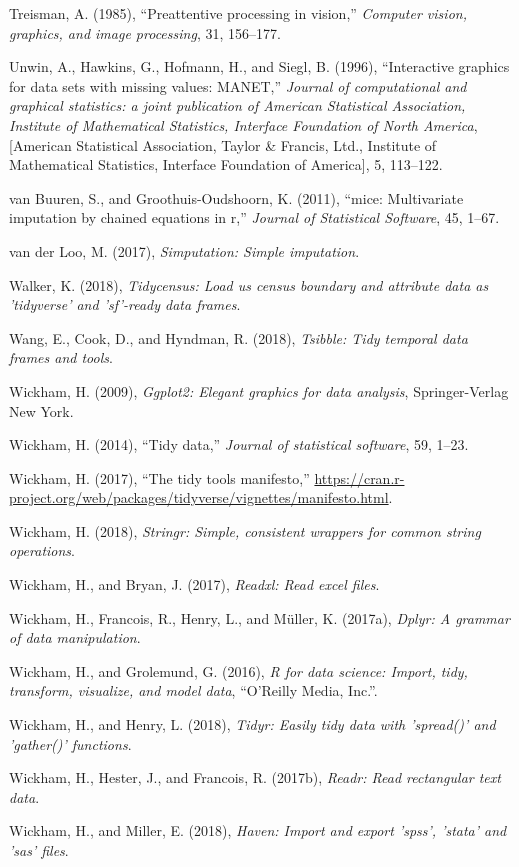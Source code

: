 \documentclass[]{article}
\theoremstyle{definition}
\theoremstyle{definition}
\theoremstyle{definition}
\theoremstyle{remark}
\begin{document}
\leavevmode\hypertarget{ref-treisman1985}{}%
Treisman, A. (1985), ``Preattentive processing in vision,''
\emph{Computer vision, graphics, and image processing}, 31, 156--177.

\leavevmode\hypertarget{ref-Unwin1996}{}%
Unwin, A., Hawkins, G., Hofmann, H., and Siegl, B. (1996), ``Interactive
graphics for data sets with missing values: MANET,'' \emph{Journal of
computational and graphical statistics: a joint publication of American
Statistical Association, Institute of Mathematical Statistics, Interface
Foundation of North America}, {[}American Statistical Association,
Taylor \& Francis, Ltd., Institute of Mathematical Statistics, Interface
Foundation of America{]}, 5, 113--122.

\leavevmode\hypertarget{ref-mice}{}%
van Buuren, S., and Groothuis-Oudshoorn, K. (2011), ``mice: Multivariate
imputation by chained equations in r,'' \emph{Journal of Statistical
Software}, 45, 1--67.

\leavevmode\hypertarget{ref-simputation}{}%
van der Loo, M. (2017), \emph{Simputation: Simple imputation}.

\leavevmode\hypertarget{ref-tidycensus}{}%
Walker, K. (2018), \emph{Tidycensus: Load us census boundary and
attribute data as 'tidyverse' and 'sf'-ready data frames}.

\leavevmode\hypertarget{ref-tsibble}{}%
Wang, E., Cook, D., and Hyndman, R. (2018), \emph{Tsibble: Tidy temporal
data frames and tools}.

\leavevmode\hypertarget{ref-ggplot2}{}%
Wickham, H. (2009), \emph{Ggplot2: Elegant graphics for data analysis},
Springer-Verlag New York.

\leavevmode\hypertarget{ref-Wickham2014}{}%
Wickham, H. (2014), ``Tidy data,'' \emph{Journal of statistical
software}, 59, 1--23.

\leavevmode\hypertarget{ref-Tidyverse-Manifesto}{}%
Wickham, H. (2017), ``The tidy tools manifesto,''
\url{https://cran.r-project.org/web/packages/tidyverse/vignettes/manifesto.html}.

\leavevmode\hypertarget{ref-stringr}{}%
Wickham, H. (2018), \emph{Stringr: Simple, consistent wrappers for
common string operations}.

\leavevmode\hypertarget{ref-readxl}{}%
Wickham, H., and Bryan, J. (2017), \emph{Readxl: Read excel files}.

\leavevmode\hypertarget{ref-dplyr}{}%
Wickham, H., Francois, R., Henry, L., and Müller, K. (2017a),
\emph{Dplyr: A grammar of data manipulation}.

\leavevmode\hypertarget{ref-r4ds}{}%
Wickham, H., and Grolemund, G. (2016), \emph{R for data science: Import,
tidy, transform, visualize, and model data}, ``O'Reilly Media, Inc.''.

\leavevmode\hypertarget{ref-tidyr}{}%
Wickham, H., and Henry, L. (2018), \emph{Tidyr: Easily tidy data with
'spread()' and 'gather()' functions}.

\leavevmode\hypertarget{ref-readr}{}%
Wickham, H., Hester, J., and Francois, R. (2017b), \emph{Readr: Read
rectangular text data}.

\leavevmode\hypertarget{ref-haven}{}%
Wickham, H., and Miller, E. (2018), \emph{Haven: Import and export
'spss', 'stata' and 'sas' files}.
\end{document}
